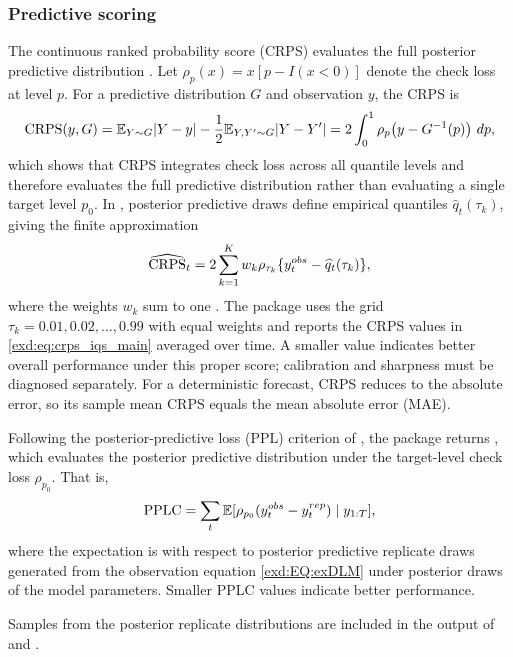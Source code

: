 \subsubsection{Predictive scoring}
The continuous ranked probability score (CRPS) evaluates the full posterior predictive distribution \citep{exd-gneiting2007}.
Let $\rho_p(x)=x[p-I(x<0)]$ denote the check loss at level $p$. For a predictive distribution $G$ and observation $y$, the CRPS is
\begin{equation}
\operatorname{CRPS}(y,G)=\mathbb{E}_{Y\sim G}|Y-y|-\frac{1}{2}\mathbb{E}_{Y,Y'\sim G}|Y-Y'|
=2\int_0^1 \rho_p\!\left(y-G^{-1}(p)\right)\,dp,
\label{exd:eq:crps_main}
\end{equation}
which shows that CRPS integrates check loss across all quantile levels and therefore evaluates the full predictive distribution rather than evaluating a single target level \(p_0\). In , posterior predictive draws define empirical quantiles \(\widehat q_t(\tau_k)\), giving the finite approximation
\begin{equation}
\widehat{\operatorname{CRPS}}_t
=
2\sum_{k=1}^{K} w_k
\rho_{\tau_k}\{y_t^{obs}-\widehat q_t(\tau_k)\},
\label{exd:eq:crps_iqs_main}
\end{equation}
where the weights \(w_k\) sum to one \citep{exd-laio2007verification}. The package uses the grid \(\tau_k=0.01,0.02,\ldots,0.99\) with equal weights and reports the CRPS values in \eqref{exd:eq:crps_iqs_main} averaged over time. A smaller value indicates better overall performance under this proper score; calibration and sharpness must be diagnosed separately. For a deterministic forecast, CRPS reduces to the absolute error, so its sample mean CRPS equals the mean absolute error (MAE).

Following the posterior-predictive loss (PPL) criterion of
\cite{exd-gelfand1998model}, the package returns , which evaluates
the posterior predictive distribution under the target-level check loss
$\rho_{p_0}$. That is,
\begin{align}
\operatorname{PPLC} = \sum_t \mathbb{E}[\rho_{p_0} (y_t^{obs}-y^{rep}_t) \mid y_{1:T}],
\label{exd:eq:pplc_main}
\end{align}
where the expectation is with respect to posterior predictive replicate draws generated from the observation equation \eqref{exd:EQ:exDLM} under posterior draws of the model parameters.
Smaller PPLC values indicate better performance.

Samples from the posterior replicate distributions are included in the output of  and .

